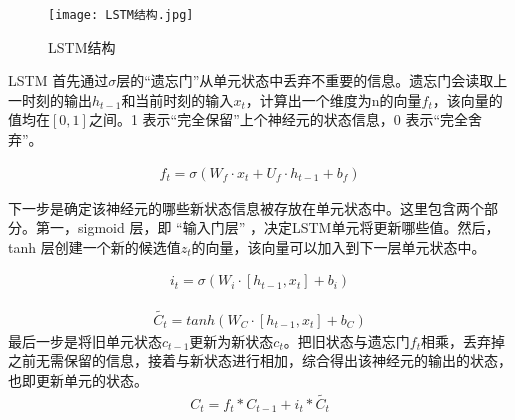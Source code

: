 \begin{figure}
    \centering
    \texttt{[image: LSTM结构.jpg]}
    \caption{LSTM结构}
    \label{fig:LSTM结构}
  \end{figure}
  LSTM 首先通过$\sigma$层的“遗忘门”从单元状态中丢弃不重要的信息。遗忘门会读取上一时刻的输出$h_{t-1}$和当前时刻的输入$x_t$，计算出一个维度为n的向量$f_t$，该向量的值均在$[0, 1]$之间。1 表示“完全保留”上个神经元的状态信息，0 表示“完全舍弃”。

\begin{equation}
    \begin{aligned}
        f_t = \sigma(W_f\cdot x_t + U_f\cdot h_{t-1} + b_f)
    \end{aligned}
\end{equation}

下一步是确定该神经元的哪些新状态信息被存放在单元状态中。这里包含两个部分。第一，sigmoid 层，即 “输入门层” ，决定LSTM单元将更新哪些值。然后， tanh 层创建一个新的候选值$z_t$的向量，该向量可以加入到下一层单元状态中。

\begin{equation}
    \begin{aligned}
        i_t = \sigma(W_i\cdot[h_{t-1},x_t] + b_i)
    \end{aligned}
\end{equation}

\begin{equation}
    \begin{aligned}
        \widetilde {C_t} = tanh(W_C\cdot[h_{t-1},x_t]+b_C)
    \end{aligned}
\end{equation}
最后一步是将旧单元状态$c_{t-1}$更新为新状态$c_t$。把旧状态与遗忘门$f_t$相乘，丢弃掉之前无需保留的信息，接着与新状态进行相加，综合得出该神经元的输出的状态，也即更新单元的状态。
\begin{equation}
    \begin{aligned}
        C_t = f_t * C_{t-1} + i_t * \widetilde{C_t}
    \end{aligned}
\end{equation}


